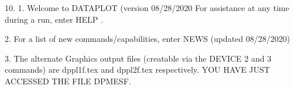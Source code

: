 10.
1. Welcome to DATAPLOT (version 08/28/2020  For assistance at
   any time during a run, enter HELP   .

2. For a list of new commands/capabilities,
   enter NEWS  (updated 08/28/2020)

3. The alternate Graphics output files (creatable
   via the DEVICE 2 and 3 commands) are
   dppl1f.tex and dppl2f.tex respectively.
YOU HAVE JUST ACCESSED THE FILE DPMESF.
